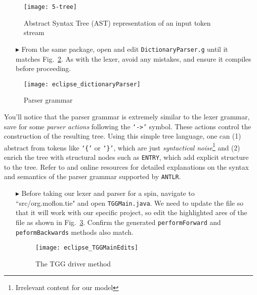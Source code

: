 \vspace{0.5cm}

\begin{figure}[htp]
\begin{center}
 \texttt{[image: 5-tree]}
  \caption{Abstract Syntax Tree (AST) representation of an input token stream}
  \label{fig:dictLexer}
\end{center}
\end{figure}

\begin{itemize}

\item[$\blacktriangleright$] From the same package, open and edit \texttt{DictionaryParser.g} until it matches Fig.~\ref{eclipse:dictParser}. As with the lexer,
avoid any mistakes, and ensure it compiles before proceeding.

\end{itemize}

\begin{figure}[!htbp]
\begin{center}
 \texttt{[image: eclipse\_dictionaryParser]}
  \caption{Parser grammar}
  \label{eclipse:dictParser}
\end{center}
\end{figure}

You'll notice that the parser grammar is extremely similar to the lexer grammar, save for some \emph{parser actions} following the \texttt{`->'} symbol. These
actions control the construction of the resulting tree. Using this simple tree language, one can (1) abstract from tokens like \texttt{`\{'} or \texttt{`\}'},
which are just \emph{syntactical noise}\footnote{Irrelevant content for our model} and (2) enrich the tree with structural nodes such as \texttt{ENTRY}, which
add explicit structure to the tree. Refer to \cite{ANTLR} and online resources for detailed explanations on the syntax and semantics of the parser grammar
supported by \texttt{ANTLR}.

\newpage

\begin{itemize}

\item[$\blacktriangleright$] Before taking our lexer and parser for a spin, navigate to \\ ``src/org.moflon.tie" and open \texttt{TGGMain.java}. We need to
update the file so that it will work with our specific project, so edit the highlighted ares of the file as shown in Fig.~\ref{eclipse:defaultTGGMain}. Confirm
the generated \texttt{performForward} and \texttt{peformBackwards} methods also match.

\begin{figure}[!htbp]
\begin{center}
 \texttt{[image: eclipse\_TGGMainEdits]}
  \caption{The TGG driver method}
  \label{eclipse:defaultTGGMain}
\end{center}
\end{figure}

\end{itemize}

